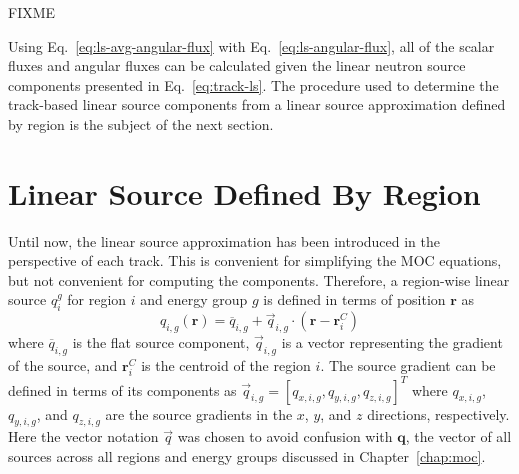 FIXME

Using Eq.~\ref{eq:ls-avg-angular-flux} with Eq.~\ref{eq:ls-angular-flux}, all of the scalar fluxes and angular fluxes can be calculated given the linear neutron source components presented in Eq.~\ref{eq:track-ls}. The procedure used to determine the track-based linear source components from a linear source approximation defined by region is the subject of the next section.

\section{Linear Source Defined By Region}
\label{sec:derivation-of-moc}

Until now, the linear source approximation has been introduced in the perspective of each track. This is convenient for simplifying the MOC equations, but not convenient for computing the components. Therefore, a region-wise linear source $q_i^g$ for region $i$ and energy group $g$ is defined in terms of position $\mathbf{r}$ as
\begin{equation}
q_{i,g}(\mathbf{r}) = \overline{q}_{i,g} + \vec{q}_{i,g} \cdot \left( \mathbf{r} - \mathbf{r}^C_i \right)
\label{eq:ls-regional}
\end{equation}
where $\overline{q}_{i,g}$ is the flat source component, $\vec{q}_{i,g}$ is a vector representing the gradient of the source, and $\mathbf{r}^C_i$ is the centroid of the region $i$. The source gradient can be defined in terms of its components as $\vec{q}_{i,g} = \left[q_{x,i,g}, q_{y,i,g}, q_{z,i,g} \right]^T$ where $q_{x,i,g}$, $q_{y,i,g}$, and $q_{z,i,g}$ are the source gradients in the $x$, $y$, and $z$ directions, respectively. Here the vector notation $\vec{q}$ was chosen to avoid confusion with $\mathbf{q}$, the vector of all sources across all regions and energy groups discussed in Chapter~\ref{chap:moc}.

